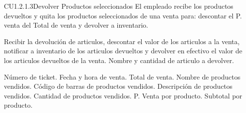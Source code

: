 \begin{UseCase} {CU1.2.1.3}{Devolver Productos seleccionados}{
	El empleado recibe los productos devueltos y quita los productos seleccionados de una venta para: descontar el P. venta del Total de venta y devolver a inventario.
}








	
	{
	}
	{
		Recibir la devolución de articulos, descontar el valor de los articulos a la venta, notificar a inventario de los articulos devueltos y devolver en efectivo el valor de los articulos devueltos de la venta.
	}
	{
		\UCli Nombre y cantidad de articulo a devolver.
	}
	{
		\UCli Número de ticket.
		\UCli Fecha y hora de venta.
		\UCli Total de venta.
		\UCli Nombre de productos vendidos.
		\UCli Código de barras de productos vendidos.
		\UCli Descripción de productos vendidos.
		\UCli Cantidad de productos vendidos.
		\UCli P. Venta por producto.
		\UCli Subtotal por producto.
		
	}


\end{UseCase}
